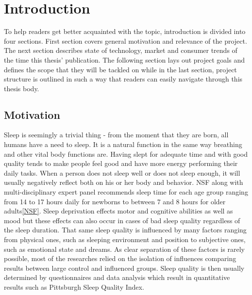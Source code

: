 \chapter{Introduction}
\label{chap:introduction}

To help readers get better acquainted with the topic, introduction is divided into four sections. First section covers general motivation and relevance of the project. The next section describes state of technology, market and consumer trends of the time this thesis' publication. The following section lays out project goals and defines the scope that they will be tackled on while in the last section, project structure is outlined in such a way that readers can easily navigate through this thesis body.


\section{Motivation}

Sleep is seemingly a trivial thing - from the moment that they are born, all humans have a need to sleep. It is a natural function in the same way breathing and other vital body functions are. Having slept for adequate time and with good quality tends to make people feel good and have more energy performing their daily tasks. When a person does not sleep well or does not sleep enough, it will usually negatively reflect both on his or her body and behavior. \ac{NSF} along with multi-disciplinary expert panel recommends sleep time for each age group ranging from 14 to 17 hours daily for newborns to between 7 and 8 hours for older adults\ref{NSF}. Sleep deprivation effects motor and cognitive abilities as well as mood but these effects can also occur in cases of bad sleep quality regardless of the sleep duration\cite{doi:10.1093/sleep/19.4.318}. That same sleep quality is influenced by many factors ranging from physical ones, such as sleeping environment and position to subjective ones, such as emotional state and dreams. As clear separation of these factors is rarely possible, most of the researches relied on the isolation of influences comparing results between large control and influenced groups. Sleep quality is then usually determined by questionnaires and data analysis which result in quantitative results such as Pittsburgh Sleep Quality Index\cite{psqi}.\\

